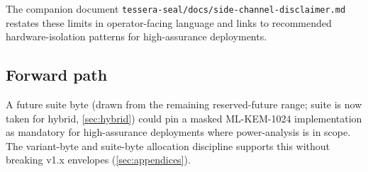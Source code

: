 The companion document \texttt{tessera-seal/docs/side-channel-disclaimer.md} restates these limits in operator-facing language and links to recommended hardware-isolation patterns for high-assurance deployments.

\subsection{Forward path}

A future suite byte (drawn from the remaining reserved-future range; suite  is now taken for hybrid, \cref{sec:hybrid}) could pin a masked ML-KEM-1024 implementation as mandatory for high-assurance deployments where power-analysis is in scope. The variant-byte and suite-byte allocation discipline supports this without breaking v1.x envelopes (\cref{sec:appendices}).
